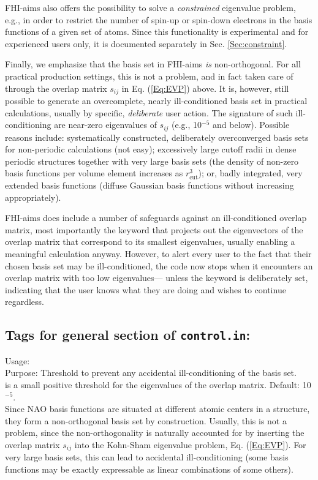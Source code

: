 FHI-aims also offers the possibility to solve a \emph{constrained} eigenvalue
problem, e.g., in order to restrict the number of spin-up or spin-down electrons
in the basis functions of a given set of atoms. Since this functionality is
experimental and for experienced users only, it is documented separately in
Sec. \ref{Sec:constraint}.

Finally, we emphasize that the basis set in FHI-aims \emph{is} non-orthogonal.
For all practical production settings, this is not a problem, and in fact taken
care of through the overlap matrix $s_{ij}$ in Eq. (\ref{Eq:EVP}) above. It is,
however, still possible to generate an overcomplete, nearly ill-conditioned
basis set in practical calculations, usually by specific, \emph{deliberate}
user action. The signature of such ill-conditioning are near-zero eigenvalues of
$s_{ij}$ (e.g., 10$^{-5}$ and below). Possible reasons include: systematically
constructed, deliberately overconverged basis sets for non-periodic calculations
(not easy); excessively large cutoff radii in dense periodic structures together
with very large basis sets (the density of non-zero basis functions per volume
element increases as $r_\text{cut}^3$); or, badly integrated, very extended
basis functions (diffuse Gaussian basis functions without increasing
 appropriately).

FHI-aims does include a number of safeguards against an ill-conditioned overlap
matrix, most importantly the  keyword that projects
out the eigenvectors of the overlap matrix that correspond to its smallest
eigenvalues, usually enabling a meaningful calculation anyway. However, to alert
every user to the fact that their chosen basis set may be ill-conditioned, the
code now stops when it encounters an overlap matrix with too low eigenvalues---
unless the keyword  is deliberately set,
indicating that the user knows what they are doing and wishes to continue
regardless.

\newpage

\subsection*{Tags for general section of \texttt{control.in}:}

{
  \noindent
  Usage:   \\[1.0ex]
  Purpose: Threshold to prevent any accidental ill-conditioning of the basis
    set. \\[1.0ex]
   is a small positive threshold for the eigenvalues of the
    overlap matrix. Default: 10$^{-5}$. \\
}
Since NAO basis functions are situated at different atomic centers in a
structure, they form a non-orthogonal basis set by construction. Usually, this
is not a problem, since the non-orthogonality is naturally accounted for by
inserting the overlap matrix $s_{ij}$ into the Kohn-Sham eigenvalue problem,
Eq. (\ref{Eq:EVP}). For very large basis sets, this can lead to accidental
ill-conditioning (some basis functions may be exactly expressable as linear
combinations of some others).

